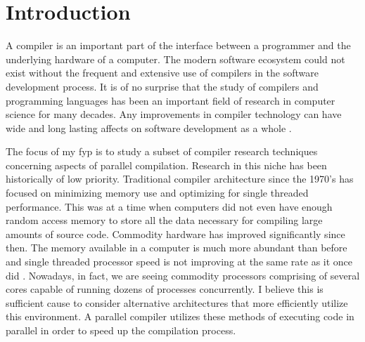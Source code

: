 \chapter{Introduction} \label{introduction}

A \gls{compiler} is an important part of the interface between a programmer
and the underlying hardware of a computer. The modern software ecosystem
could not exist without the frequent and extensive use of compilers in
the software development process. It is of no surprise that the study of
compilers and programming languages has been an important field of research
in computer science for many decades. Any improvements in compiler technology
can have wide and long lasting affects on software development as a whole
\citep{hall_compiler_2009}.

The focus of my \gls{fyp} is to study a subset of compiler research techniques
concerning aspects of parallel compilation. Research in this niche has been
historically of low priority. Traditional compiler architecture since the
1970’s has focused on minimizing memory use and optimizing for single threaded
performance. This was at a time when computers did not even have enough random
access memory to store all the data necessary for compiling large amounts of
source code. Commodity hardware has improved significantly since then. The
memory available in a computer is much more abundant than before and single
threaded processor speed is not improving at the same rate as it once did
\citep{shalf_future_2020, williams_whats_2017}. Nowadays, in fact, we are
seeing commodity processors comprising of several cores capable of running
dozens of processes concurrently. I believe this is sufficient cause to consider
alternative architectures that more efficiently utilize this environment. A
parallel compiler utilizes these methods of executing code in parallel in order
to speed up the compilation process.

